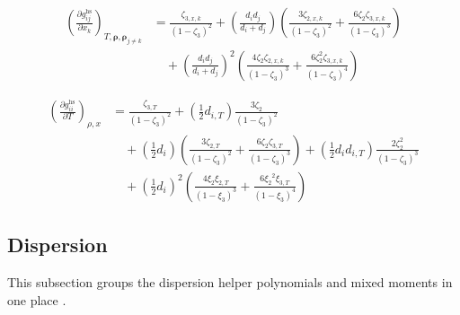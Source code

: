 \documentclass[12pt, letterpaper]{article}
\begin{document}
\begin{equation}
    \begin{aligned}
        \left(\frac{\partial g_{ij}^{\mathrm{hs}}}{\partial x_{k}}\right)_{T,\boldsymbol{\rho},\boldsymbol{\rho}_{j\neq k}}
        &=\frac{\zeta_{3,x,k}}{\left(1-\zeta_{3}\right)^{2}}
        +\left(\frac{d_{i}d_{j}}{d_{i}+d_{j}}\right)
        \left(\frac{3\zeta_{2,x,k}}{(1-\zeta_{3})^{2}}+\frac{6\zeta_{2}\zeta_{3,x,k}}{(1-\zeta_{3})^{3}}\right)
        \\
        &\quad +\left(\frac{d_{i}d_{j}}{d_{i}+d_{j}}\right)^{2}
        \left(\frac{4\zeta_{2}\zeta_{2,x,k}}{(1-\zeta_{3})^{3}}+\frac{6\zeta_{2}^{2}\zeta_{3,x,k}}{(1-\zeta_{3})^{4}}\right)
    \end{aligned}
    \label{eq:ghs_contact_dxk}
\end{equation}


\begin{equation}
    \begin{aligned}
        \left(\frac{\partial g_{ii}^{\mathrm{hs}}}{\partial T}\right)_{\rho,x}
        &=\frac{\zeta_{3,T}}{\left(1-\zeta_{3}\right)^{2}}
        +\left(\frac{1}{2}d_{i,T}\right)\frac{3\zeta_{2}}{\left(1-\zeta_{3}\right)^{2}}
        \\
        &\quad +\left(\frac{1}{2}d_{i}\right)\left(\frac{3\zeta_{2,T}}{\left(1-\zeta_{3}\right)^{2}}+\frac{6\zeta_{2}\zeta_{3,T}}{\left(1-\zeta_{3}\right)^{3}}\right)
        +\left(\frac{1}{2}d_{i}d_{i,T}\right)\frac{2\zeta_{2}^{2}}{\left(1-\zeta_{3}\right)^{3}}
        \\
        &\quad +\left(\frac{1}{2}d_{i}\right)^{2}\left(\frac{4\xi_{2}\xi_{2,T}}{\left(1-\xi_{3}\right)^{3}}+\frac{6\xi_{2}{}^{2}\xi_{3,T}}{\left(1-\xi_{3}\right)^{4}}\right)
    \end{aligned}
    \label{eq:ghs_contact_dT}
\end{equation}

\subsection{Dispersion}
\label{sec:dispersion}

This subsection groups the dispersion helper polynomials and mixed moments in one place \cite{Gross2001}.
\end{document}
